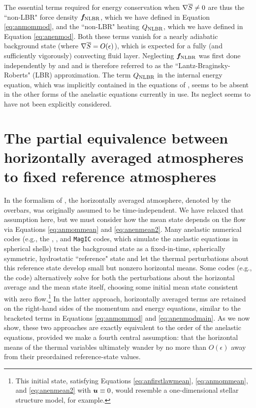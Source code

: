 \documentclass[12pt]{article}
\newcommand{\heatnlbr}{Q_{\rm NLBR}}
\newcommand{\forcenlbr}{\bm{f}_{\rm NLBR}}
\begin{document}

The essential terms required for energy conservation when $\nabla\overline{S}\neq0$ are thus the ``non-LBR" force density $\forcenlbr$, which we have defined in Equation \eqref{eq:anmommod}, and the ``non-LBR" heating $\heatnlbr$, which we have defined in Equation \eqref{eq:anenmod}. Both these terms vanish for a nearly adiabatic background state (where $\nabla\overline{S}=O(\epsilon)$), which is expected for a fully (and sufficiently vigorously) convecting fluid layer.  Neglecting $\forcenlbr$ was first done independently by \citet{Lantz1992} and \citet{Braginsky1995} and is therefore referred to as the ``Lantz-Braginsky-Roberts" (LBR) approximation. The term $Q_{\rm NLBR}$ in the internal energy equation, which was implicitly contained in the equations of \citet{Gough1969}, seems to be absent in the other forms of the anelastic equations currently in use. Its neglect seems to have not been explicitly considered. 

\section{The partial equivalence between horizontally averaged atmospheres to fixed reference atmospheres}\label{sec:meantoref}
In the formalism of \citet{Gough1969}, the horizontally averaged atmosphere, denoted by the overbars, was originally assumed to be time-independent. We have relaxed that assumption here, but we must consider how the mean state depends on the flow via Equations \eqref{eq:anmommean} and \eqref{eq:anenmean2}. Many anelastic numerical codes (e.g., the {\rayleigh}, {\eulag}, and \texttt{MagIC} codes, which simulate the anelastic equations in spherical shells) treat the background state as a fixed-in-time, spherically symmetric, hydrostatic ``reference" state and let the thermal perturbations about this reference state develop small but nonzero horizontal means. Some codes (e.g., the {\ash} code) alternatively solve for both the perturbations about the horizontal average and the mean state itself, choosing some initial mean state consistent with zero flow.\footnote{This initial state, satisfying Equations \eqref{eq:anfirstlawmean}, \eqref{eq:anmommean}, and \eqref{eq:anenmean2} with $\bm{u}\equiv0$, would resemble a one-dimensional stellar structure model, for example.} In the latter approach, horizontally averaged terms are retained on the right-hand sides of the momentum and energy equations, similar to the bracketed terms in Equations \eqref{eq:anmommod} and \eqref{eq:anenmodmain}. As we now show, these two approaches are exactly equivalent to the order of the anelastic equations, provided we make a fourth central assumption: that the horizontal means of the thermal variables ultimately wander by no more than $O(\epsilon)$ away from their preordained reference-state values. 
\end{document}
